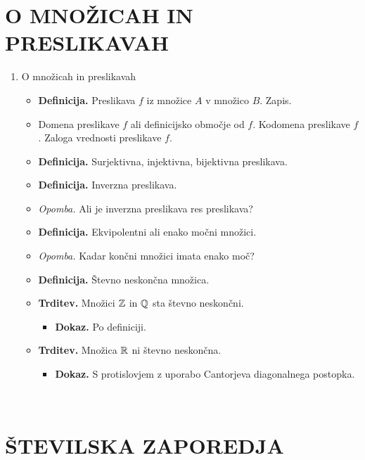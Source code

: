 \section*{O MNOŽICAH IN PRESLIKAVAH}

\begin{enumerate}
    \item O množicah in preslikavah
    \begin{itemize}
        \item \colorbox{purple!30}{\textbf{Definicija.}} Preslikava $f$ iz množice $A$ v množico $B$. Zapis. 
        \item Domena preslikave $f$ ali definicijsko območje od $f$. Kodomena preslikave $f$. Zaloga vrednosti preslikave $f$.
        \item \colorbox{purple!30}{\textbf{Definicija.}} Surjektivna, injektivna, bijektivna preslikava. 
        \item \colorbox{purple!30}{\textbf{Definicija.}} Inverzna preslikava.
        \item \colorbox{yellow!30}{\emph{Opomba.}}  Ali je inverzna preslikava res preslikava?
        \item \colorbox{purple!30}{\textbf{Definicija.}} Ekvipolentni ali enako močni množici.
        \item \colorbox{yellow!30}{\emph{Opomba.}} Kadar končni množici imata enako moč?
        \item \colorbox{purple!30}{\textbf{Definicija.}} Števno neskončna množica.
        \item \colorbox{blue!30}{\textbf{Trditev.}}  Množici $\mathbb{Z}$ in $\mathbb{Q}$ sta števno neskončni.
        \begin{itemize}
            \item \colorbox{green!30}{\textbf{Dokaz.}} Po definiciji.
        \end{itemize}
        \item \colorbox{blue!30}{\textbf{Trditev.}}  Množica $\mathbb{R}$ ni števno neskončna.
        
        \begin{itemize}
            \item \colorbox{green!30}{\textbf{Dokaz.}} S protislovjem z uporabo Cantorjeva diagonalnega postopka. 
        \end{itemize}
    \end{itemize}
\end{enumerate}

\newpage
\

\newpage
\section{ŠTEVILSKA ZAPOREDJA}

